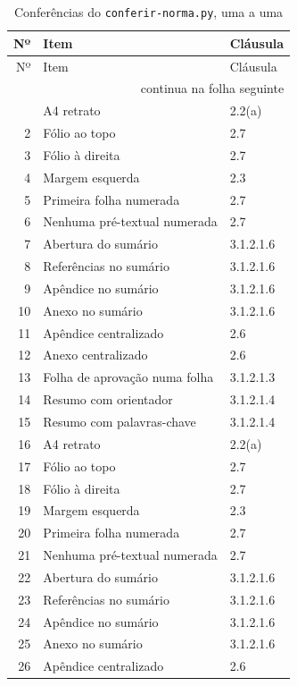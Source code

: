 \documentclass[dsc,pdfa,coorientador,numbers,twoside,orientadorexamina]{coppe}
\begin{document}
  \begin{longtable}{rll}
    \caption{Conferências do \texttt{conferir-norma.py}, uma a uma}
    \label{tab:long}\\
    \hline Nº & Item & Cláusula\\ \hline
    \endfirsthead
    \hline Nº & Item & Cláusula\\ \hline
    \endhead
    \hline \multicolumn{3}{r}{\footnotesize continua na folha seguinte}\\
    \endfoot
    \hline
    \endlastfoot
    1 & A4 retrato & 2.2(a)\\
    2 & Fólio ao topo & 2.7\\
    3 & Fólio à direita & 2.7\\
    4 & Margem esquerda & 2.3\\
    5 & Primeira folha numerada & 2.7\\
    6 & Nenhuma pré-textual numerada & 2.7\\
    7 & Abertura do sumário & 3.1.2.1.6\\
    8 & Referências no sumário & 3.1.2.1.6\\
    9 & Apêndice no sumário & 3.1.2.1.6\\
    10 & Anexo no sumário & 3.1.2.1.6\\
    11 & Apêndice centralizado & 2.6\\
    12 & Anexo centralizado & 2.6\\
    13 & Folha de aprovação numa folha & 3.1.2.1.3\\
    14 & Resumo com orientador & 3.1.2.1.4\\
    15 & Resumo com palavras-chave & 3.1.2.1.4\\
    16 & A4 retrato & 2.2(a)\\
    17 & Fólio ao topo & 2.7\\
    18 & Fólio à direita & 2.7\\
    19 & Margem esquerda & 2.3\\
    20 & Primeira folha numerada & 2.7\\
    21 & Nenhuma pré-textual numerada & 2.7\\
    22 & Abertura do sumário & 3.1.2.1.6\\
    23 & Referências no sumário & 3.1.2.1.6\\
    24 & Apêndice no sumário & 3.1.2.1.6\\
    25 & Anexo no sumário & 3.1.2.1.6\\
    26 & Apêndice centralizado & 2.6\\

\end{longtable}
\end{document}
